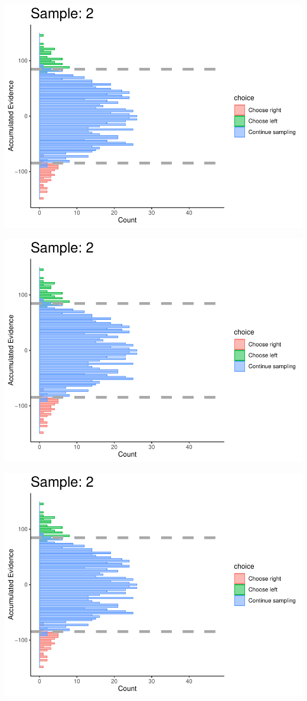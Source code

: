\documentclass[
]{book}
\begin{document}
\begin{center}\includegraphics[width=0.8\linewidth]{LateNightBayes_files/figure-latex/collapsing_check-11} \end{center}

\begin{center}\includegraphics[width=0.8\linewidth]{LateNightBayes_files/figure-latex/collapsing_check-12} \end{center}

\begin{center}\includegraphics[width=0.8\linewidth]{LateNightBayes_files/figure-latex/collapsing_check-13} \end{center}
\end{document}
